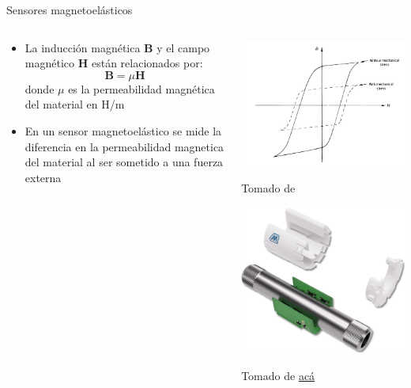 \documentclass[aspectratio=169]{beamer}
\begin{document}
\begin{frame}{Sensores magnetoelásticos}
    \begin{columns}[c, onlytextwidth]
        \begin{column}{0.6\textwidth}
            \begin{itemize}
                \item La inducción magnética $\mathbf{B}$ y el campo magnético $\mathbf{H}$ están relacionados por:
                \begin{equation*}
                    \mathbf{B} = \mu \mathbf{H}
                \end{equation*}
                donde $\mu$ es la permeabilidad magnética del material en \si{\henry/\meter}
                \item En un sensor magnetoelástico se mide la diferencia en la permeabilidad magnetica del material al ser sometido a una fuerza externa

            \end{itemize}
        \end{column}
        \begin{column}{0.40\textwidth}
            \centering
            \includegraphics[width = 0.5\linewidth]{fig/Fuerza_Vibracion/magnetoelastico.JPG}
            
            \tiny{Tomado de \cite{pallas2012sensors}}
            
            \includegraphics[width = 0.6\linewidth]{fig/Fuerza_Vibracion/Torque-Sensor.png}
            
            \tiny{Tomado de \href{https://www.methodesensor.com/industries/industrial/torque-sensing/}{acá}}
        \end{column}
    \end{columns}
\end{frame}
\end{document}

